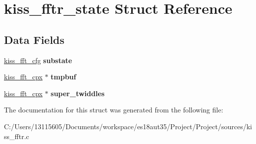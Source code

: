 \hypertarget{structkiss__fftr__state}{}\section{kiss\+\_\+fftr\+\_\+state Struct Reference}
\label{structkiss__fftr__state}
\subsection*{Data Fields}
\begin{DoxyCompactItemize}
\item 
\hypertarget{structkiss__fftr__state_acdccafcf502fec1c13450c2eae901738}{}\hyperlink{structkiss__fft__state}{kiss\+\_\+fft\+\_\+cfg} {\bfseries substate}\label{structkiss__fftr__state_acdccafcf502fec1c13450c2eae901738}

\item 
\hypertarget{structkiss__fftr__state_ae0b38b99d0ec7540abab4211093fdd99}{}\hyperlink{structkiss__fft__cpx}{kiss\+\_\+fft\+\_\+cpx} $\ast$ {\bfseries tmpbuf}\label{structkiss__fftr__state_ae0b38b99d0ec7540abab4211093fdd99}

\item 
\hypertarget{structkiss__fftr__state_ae612ac0806b0ceee4868f1829aa05e78}{}\hyperlink{structkiss__fft__cpx}{kiss\+\_\+fft\+\_\+cpx} $\ast$ {\bfseries super\+\_\+twiddles}\label{structkiss__fftr__state_ae612ac0806b0ceee4868f1829aa05e78}

\end{DoxyCompactItemize}


The documentation for this struct was generated from the following file\+:\begin{DoxyCompactItemize}
\item 
C\+:/\+Users/13115605/\+Documents/workspace/es18aut35/\+Project/\+Project/sources/kiss\+\_\+fftr.\+c\end{DoxyCompactItemize}
